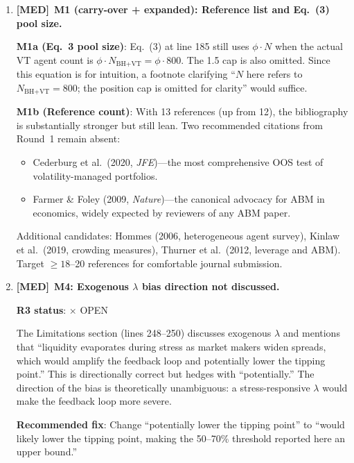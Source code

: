 \documentclass[12pt,a4paper]{article}
\newcommand{\MED}{\textbf{\textcolor{warncolor}{[MED]}}}
\newcommand{\OPEN}{\textcolor{errorred}{$\times$ OPEN}}
\begin{document}
\begin{enumerate}
\textbf{Recommended fix}: Add a footnote to Table~1: ``The risk-free rate is zero in the simulation. VT weights can reach 1.5 (implicit leverage). At high $\phi$, VT trading endogenously affects the market return from which the Sharpe ratio is computed.''

\medskip

\item \MED\ \textbf{M1 (carry-over + expanded): Reference list and Eq.~(3) pool size.}

\textbf{M1a (Eq.~3 pool size)}: Eq.~(3) at line 185 still uses $\phi \cdot N$ when the actual VT agent count is $\phi \cdot N_{\text{BH+VT}} = \phi \cdot 800$. The 1.5 cap is also omitted. Since this equation is for intuition, a footnote clarifying ``$N$ here refers to $N_{\text{BH+VT}} = 800$; the position cap is omitted for clarity'' would suffice.

\textbf{M1b (Reference count)}: With 13 references (up from 12), the bibliography is substantially stronger but still lean. Two recommended citations from Round~1 remain absent:
\begin{itemize}[nosep]
  \item Cederburg et al.\ (2020, \emph{JFE})---the most comprehensive OOS test of volatility-managed portfolios.
  \item Farmer \& Foley (2009, \emph{Nature})---the canonical advocacy for ABM in economics, widely expected by reviewers of any ABM paper.
\end{itemize}
Additional candidates: Hommes (2006, heterogeneous agent survey), Kinlaw et al.\ (2019, crowding measures), Thurner et al.\ (2012, leverage and ABM). Target $\geq 18$--20 references for comfortable journal submission.

\medskip

\item \MED\ \textbf{M4: Exogenous $\lambda$ bias direction not discussed.}

\textbf{R3 status}: \OPEN

The Limitations section (lines 248--250) discusses exogenous $\lambda$ and mentions that ``liquidity evaporates during stress as market makers widen spreads, which would amplify the feedback loop and potentially lower the tipping point.'' This is directionally correct but hedges with ``potentially.'' The direction of the bias is theoretically unambiguous: a stress-responsive $\lambda$ would make the feedback loop more severe.

\textbf{Recommended fix}: Change ``potentially lower the tipping point'' to ``would likely lower the tipping point, making the 50--70\% threshold reported here an upper bound.''


\end{enumerate}
\end{document}
